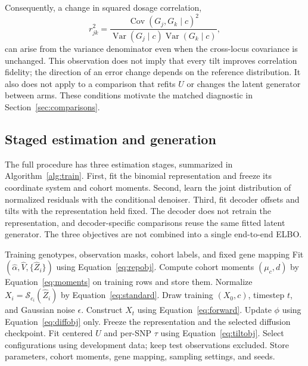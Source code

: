 \documentclass[11pt,a4paper]{article}
\newcommand{\Var}{\operatorname{Var}}
\newcommand{\Cov}{\operatorname{Cov}}
\begin{document}
Consequently, a change in squared dosage correlation,
\begin{equation}
 r_{jk}^2=
 \frac{\Cov(G_j,G_k\mid c)^2}
      {\Var(G_j\mid c)\Var(G_k\mid c)},
 \label{eq:r2}
\end{equation}
can arise from the variance denominator even when the cross-locus covariance
is unchanged. This observation does not imply that every tilt improves
correlation fidelity; the direction of an error change depends on the
reference distribution. It also does not apply to a comparison that refits
$U$ or changes the latent generator between arms. These conditions motivate
the matched diagnostic in Section~\ref{sec:comparisons}.

\subsection{Staged estimation and generation}
\label{sec:algorithm}

The full procedure has three estimation stages, summarized in
Algorithm~\ref{alg:train}. First, fit the binomial representation and freeze
its coordinate system and cohort moments. Second, learn the joint distribution
of normalized residuals with the conditional denoiser. Third, fit decoder
offsets and tilts with the representation held fixed. The decoder does not
retrain the representation, and decoder-specific comparisons reuse the same
fitted latent generator. The three objectives are not combined into a single
end-to-end ELBO.

\begin{algorithm}[t]
\caption{Staged fitting of HiPoDiT-T}
\label{alg:train}
\begin{algorithmic}[1]
\Require Training genotypes, observation masks, cohort labels, and fixed gene mapping
\State Fit $(\widehat\alpha,\widehat V,\{\widehat Z_i\})$ using Equation~\eqref{eq:repobj}.
\State Compute cohort moments $(\mu_{c},d)$ by Equation~\eqref{eq:moments} on training rows and store them.
\State Normalize $X_i=\mathcal S_{c_i}(\widehat Z_i)$ by Equation~\eqref{eq:standard}.
 \State Draw training $(X_0,c)$, timestep $t$, and Gaussian noise $\epsilon$.
 \State Construct $X_t$ using Equation~\eqref{eq:forward}.
 \State Update $\phi$ using Equation~\eqref{eq:diffobj} only.
\EndFor
\State Freeze the representation and the selected diffusion checkpoint.
\State Fit centered $U$ and per-SNP $\tau$ using Equation~\eqref{eq:tiltobj}.
\State Select configurations using development data; keep test observations excluded.
\State Store parameters, cohort moments, gene mapping, sampling settings, and seeds.
\end{algorithmic}
\end{algorithm}
\end{document}
